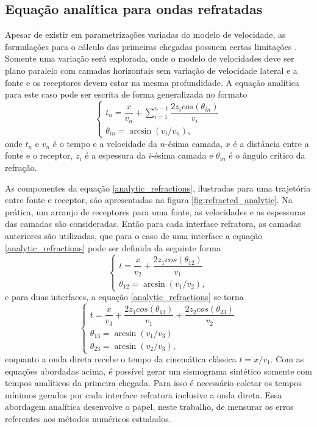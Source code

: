\subsection*{Equação analítica para ondas refratadas}

Apesar de existir em parametrizações variadas do modelo de velocidade, as formulações para o cálculo das primeiras chegadas possuem certas limitações \cite{kearey2002introduction}. Somente uma variação será explorada, onde o modelo de velocidades deve ser plano paralelo com camadas horizontais sem variação de velocidade lateral e a fonte e os receptores devem estar na mesma profundidade. A equação analítica para este caso pode ser escrita de forma generalizada no formato 
\begin{equation}
	\begin{cases}
		t_n = \dfrac{x}{v_n} + \displaystyle\sum_{i=1}^{n-1} \dfrac{2z_i cos(\theta_{in})}{v_i}\\
		\theta_{in} = \arcsin(v_i / v_n),
	\end{cases}
	\label{analytic_refractions}
\end{equation}
\noindent onde $t_n$ e $v_n$ é o tempo e a velocidade da $n$-ésima camada, $x$ é a distância entre a fonte e o receptor, $z_i$ é a espessura da $i$-ésima camada e $\theta_{in}$ é o ângulo crítico da refração. 

As componentes da equação \ref{analytic_refractions}, ilustradas para uma trajetória entre fonte e receptor, são apresentadas na figura \ref{fig:refracted_analytic}. Na prática, um arranjo de receptores para uma fonte, as velocidades e as espessuras das camadas são consideradas. Então para cada interface refratora, as camadas anteriores são utilizadas, que para o caso de uma interface a equação \ref{analytic_refractions} pode ser definida da seguinte forma 
\begin{equation}
	\begin{cases}
		t = \dfrac{x}{v_2} + \dfrac{2z_1cos(\theta_{12})}{v_1}\\
		\theta_{12} = \arcsin(v_1 / v_2),
	\end{cases}
	\label{analytic_one_layer_case}
\end{equation}   
\noindent e para duas interfaces, a equação \ref{analytic_refractions} se torna
\begin{equation}
	\begin{cases}
		t = \dfrac{x}{v_3} + \dfrac{2z_1cos(\theta_{13})}{v_1} + \dfrac{2z_2cos(\theta_{23})}{v_2}\\
		\theta_{13} = \arcsin(v_1 / v_3) \\ 
		\theta_{23} = \arcsin(v_2 / v_3), 
	\end{cases}
	\label{analytic_two_layer_case}
\end{equation}   
\noindent enquanto a onda direta recebe o tempo da cinemática clássica $t = x / v_1$. Com as equações abordadas acima, é possível gerar um sismograma sintético somente com tempos analíticos da primeira chegada. Para isso é necessário coletar os tempos mínimos gerados por cada interface refratora inclusive a onda direta. Essa abordagem analítica desenvolve o papel, neste trabalho, de mensurar os erros referentes aos métodos numéricos estudados.

